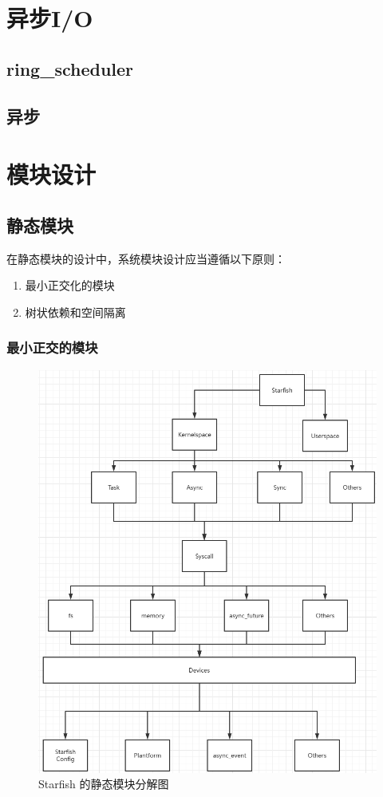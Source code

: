 \section{异步I/O}

\subsection{ring\_scheduler}

\subsection{异步}

\section{模块设计}

\subsection{静态模块}

在静态模块的设计中，系统模块设计应当遵循以下原则：

\begin{enumerate}
    \item 最小正交化的模块
    \item 树状依赖和空间隔离
\end{enumerate}

\subsubsection{最小正交的模块}


\begin{figure}[htb]
    \figureCapSet
    \centering
    \includegraphics[width=.8\linewidth]{figure/c3/starfishstructure.png}
    \caption{Starfish 的静态模块分解图}
    \label{figure:c3starfishstructure}
\end{figure}

